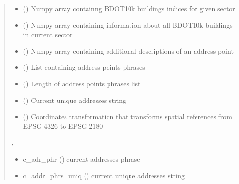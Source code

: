 \documentclass[letterpaper,10pt,english]{sphinxmanual}
\begin{document}
\begin{fulllineitems}
\begin{quote}
\begin{description}
\begin{itemize}
\item {} 
\sphinxAtStartPar
{} () \textendash{} Numpy array containng BDOT10k buildings indices for given sector

\item {} 
\sphinxAtStartPar
{} () \textendash{} Numpy array containing information about all BDOT10k buildings in current sector

\item {} 
\sphinxAtStartPar
{} () \textendash{} Numpy array containing additional descriptions of an address point

\item {} 
\sphinxAtStartPar
{} (\sphinxcode{\sphinxupquote{List}}{[}\sphinxcode{\sphinxupquote{str}}{]}) \textendash{} List containing address points phrases

\item {} 
\sphinxAtStartPar
{} () \textendash{} Length of address points phrases list

\item {} 
\sphinxAtStartPar
{} () \textendash{} Current unique addresses string

\item {} 
\sphinxAtStartPar
{} () \textendash{} Coordinates transformation that transforms spatial references from EPSG 4326 to EPSG 2180

\end{itemize}

\sphinxAtStartPar
\sphinxcode{\sphinxupquote{Tuple}}{[}, \sphinxcode{\sphinxupquote{str}}{]}

\sphinxAtStartPar
\begin{itemize}
\item {} 
\sphinxAtStartPar
c\_adr\_phr () \sphinxhyphen{} current addresses phrase

\item {} 
\sphinxAtStartPar
c\_addr\_phrs\_uniq () \sphinxhyphen{} current unique addresses string

\end{itemize}


\end{description}\end{quote}

\end{fulllineitems}
\end{document}

